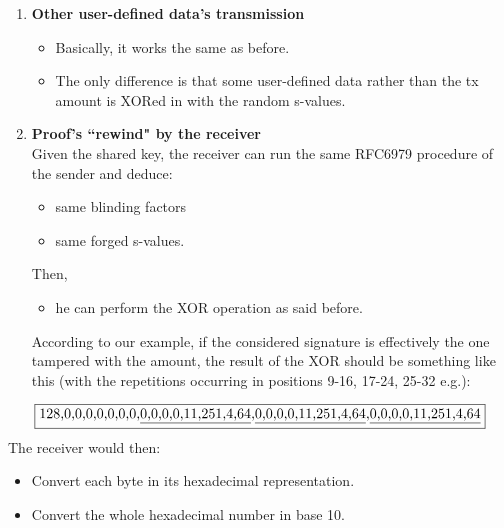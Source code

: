 \documentclass[10.5pt,compress]{beamer}
\begin{document}
\begin{frame}[allowframebreaks]
\begin{enumerate}
        \framebreak
        \item \textbf{Other user-defined data's transmission}
        \begin{itemize}
            \item Basically, it works the same as before.
            \item The only difference is that some user-defined data rather than the tx amount is XORed in with the random s-values.
        \end{itemize}
        \item \textbf{Proof's ``rewind" by the receiver}\\
        Given the shared key, the receiver can run the same RFC6979 procedure of the sender and deduce:
        \begin{itemize}
            \item same blinding factors
            \item same forged s-values.
        \end{itemize}
        Then,
        \begin{itemize}
            \item he can perform the XOR operation as said before.
        \end{itemize}
        \framebreak
        According to our example, if the considered signature is effectively the one tampered with the amount, the result of the XOR should be something like this (with the repetitions occurring in positions 9-16, 17-24, 25-32 e.g.):
        \end{enumerate}
        \begin{equation*} 
            \fbox{128,0,0,0,0,0,0,0,\underline{0,0,0,0,11,251,4,64},\underline{0,0,0,0,11,251,4,64},\underline{0,0,0,0,11,251,4,64}}            
        \end{equation*}
        The receiver would then:
        \begin{itemize}
            \item Convert each byte in its hexadecimal representation.
            \item Convert the whole hexadecimal number in base 10.
        \end{itemize}
\end{frame}
\end{document}
